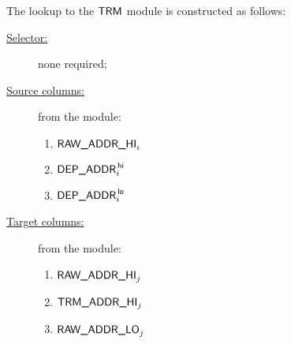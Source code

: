 The lookup to the $\textsf{TRM}$ module is constructed as follows:
\begin{description}
	\item[\underline{Selector:}] none required;
	\item[\underline{Source columns:}] from the \rlpAddrMod{} module:
			\begin{enumerate}
				\item $\textsf{RAW\_ADDR\_HI}_{i}$ 
				\item $\textsf{DEP\_ADDR}^{\mathsf{\,hi}}_{i}$  
				\item $\textsf{DEP\_ADDR}^{\mathsf{\,lo}}_{i}$
			\end{enumerate}
	\item[\underline{Target columns:}] from the \trmMod{} module: 
			\begin{enumerate}
				\item $\textsf{RAW\_ADDR\_HI}_{j}$ 
				\item $\textsf{TRM}\textsf{\_}\textsf{ADDR}\textsf{\_HI}_{j}$  
				\item $\textsf{RAW\_ADDR\_LO}_{j}$
			\end{enumerate} 
\end{description}
